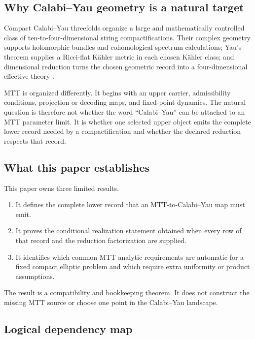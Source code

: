 \documentclass[11pt]{article}
\theoremstyle{definition}
\theoremstyle{remark}
\begin{document}
\subsection{Why Calabi--Yau geometry is a natural target}

Compact Calabi--Yau threefolds organize a large and mathematically controlled
class of ten-to-four-dimensional string compactifications.  Their complex
geometry supports holomorphic bundles and cohomological spectrum
calculations; Yau's theorem supplies a Ricci-flat K\"ahler metric in each
chosen K\"ahler class; and dimensional reduction turns the chosen geometric
record into a four-dimensional effective theory
\cite{Yau1978,CandelasEtAl1985}.

MTT is organized differently.  It begins with an upper carrier, admissibility
conditions, projection or decoding maps, and fixed-point dynamics.  The
natural question is therefore not whether the word ``Calabi--Yau'' can be
attached to an MTT parameter limit.  It is whether one selected upper object
emits the complete lower record needed by a compactification and whether the
declared reduction respects that record.

\subsection{What this paper establishes}

This paper owns three limited results.
\begin{enumerate}[leftmargin=1.7em]
\item It defines the complete lower record that an MTT-to-Calabi--Yau map must
      emit.
\item It proves the conditional realization statement obtained when every
      row of that record and the reduction factorization are supplied.
\item It identifies which common MTT analytic requirements are automatic for
      a fixed compact elliptic problem and which require extra uniformity or
      product assumptions.
\end{enumerate}
The result is a compatibility and bookkeeping theorem.  It does not construct
the missing MTT source or choose one point in the Calabi--Yau landscape.

\subsection{Logical dependency map}
\end{document}
